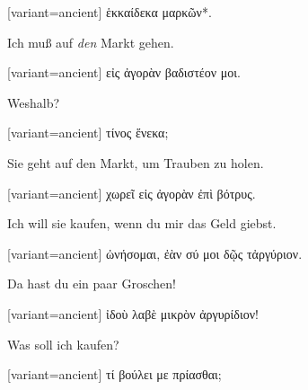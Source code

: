 \switchcolumn

\begin{greek}[variant=ancient]%
ἑκκαίδεκα μαρκῶν{*}.

\end{greek}%
Ich muß auf \emph{den} Markt gehen. 

\switchcolumn

\begin{greek}[variant=ancient]%
εἰς ἀγορὰν βαδιστέον μοι.

\end{greek}%
\switchcolumn*

Wes\textcompwordmark{}halb?

\switchcolumn

\begin{greek}[variant=ancient]%
τίνος ἕνεκα;

\end{greek}%
\switchcolumn*

Sie geht auf den Markt, um Trauben zu holen. 

\switchcolumn

\begin{greek}[variant=ancient]%
χωρεῖ εἰς ἀγορὰν ἐπὶ βότρυς.

\end{greek}%
\switchcolumn*

Ich will sie kaufen, wenn du mir das Geld giebst. 

\switchcolumn

\begin{greek}[variant=ancient]%
ὠνήσομαι, ἐὰν σύ μοι δῷς τἀργύριον.

\end{greek}%
\switchcolumn*

Da hast du ein paar Groschen! 

\switchcolumn

\begin{greek}[variant=ancient]%
ἰδοὺ λαβὲ μικρὸν ἀργυρίδιον!

\end{greek}%
\switchcolumn*

Was soll ich kaufen? 

\switchcolumn

\begin{greek}[variant=ancient]%
τί βούλει με πρίασθαι;

\end{greek}%
\switchcolumn*

